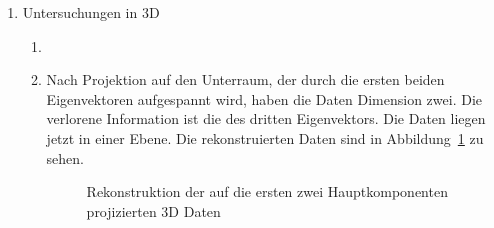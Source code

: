 \documentclass[]{report}
\newlength\figureheight
\newlength\figurewidth
\begin{document}
\begin{enumerate}
		\item Untersuchungen in 3D
		\begin{enumerate}
			\item
			
			\item
			Nach Projektion auf den Unterraum, der durch die ersten beiden Eigenvektoren aufgespannt wird, haben die Daten Dimension zwei. Die verlorene Information ist die des dritten Eigenvektors. Die Daten liegen jetzt in einer Ebene. Die rekonstruierten Daten sind in Abbildung~\ref{fig:3D projection and reconstruction} zu sehen.
			\setlength\figureheight{7cm}
			\setlength\figurewidth{\textwidth}
			\begin{figure}[tbp!]
				\centering
				
				\caption{Rekonstruktion der auf die ersten zwei Hauptkomponenten projizierten 3D Daten} 
				\label{fig:3D projection and reconstruction}
			\end{figure}
		\end{enumerate}
		

\end{enumerate}
\end{document}
